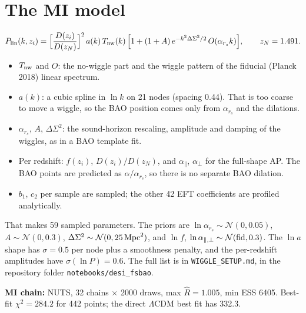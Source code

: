 \documentclass[11pt]{article}
\begin{document}
\section*{The MI model}
\[
P_{\rm lin}(k,z_i)=\Big[\frac{D(z_i)}{D(z_N)}\Big]^2\,a(k)\,T_{\rm nw}(k)\,
\Big[1+(1+A)\,e^{-k^2\Delta\Sigma^2/2}\,O(\alpha_{r_s}k)\Big],\qquad z_N=1.491 .
\]
\begin{itemize}\itemsep1pt
\item $T_{\rm nw}$ and $O$: the no-wiggle part and the wiggle pattern of the fiducial (Planck 2018) linear spectrum.
\item $a(k)$: a cubic spline in $\ln k$ on 21 nodes (spacing 0.44). That is too coarse to move a wiggle, so the BAO
  position comes only from $\alpha_{r_s}$ and the dilations.
\item $\alpha_{r_s}$, $A$, $\Delta\Sigma^2$: the sound-horizon rescaling, amplitude and damping of the wiggles, as in a BAO
  template fit.
\item Per redshift: $f(z_i)$, $D(z_i)/D(z_N)$, and $\alpha_\parallel$, $\alpha_\perp$ for the full-shape AP. The BAO
  points are predicted as $\alpha/\alpha_{r_s}$, so there is no separate BAO dilation.
\item $b_1$, $c_2$ per sample are sampled; the other 42 EFT coefficients are profiled analytically.
\end{itemize}
That makes 59 sampled parameters. The priors are $\ln\alpha_{r_s}\sim\mathcal N(0,0.05)$, $A\sim\mathcal N(0,0.3)$,
$\Delta\Sigma^2\sim\mathcal N(0,25\,{\rm Mpc}^2)$, and $\ln f$, $\ln\alpha_{\parallel,\perp}\sim\mathcal N({\rm fid},0.3)$. The
$\ln a$ shape has $\sigma=0.5$ per node plus a smoothness penalty, and the per-redshift amplitudes have $\sigma(\ln P)=0.6$.
The full list is in \texttt{WIGGLE\_SETUP.md}, in the repository folder \texttt{notebooks/desi\_fsbao}.

\textbf{MI chain:} NUTS, 32 chains $\times$ 2000 draws, max $\hat R=1.005$, min ESS 6405. Best-fit $\chi^2=284.2$
for 442 points; the direct $\Lambda$CDM best fit has 332.3.
\end{document}
